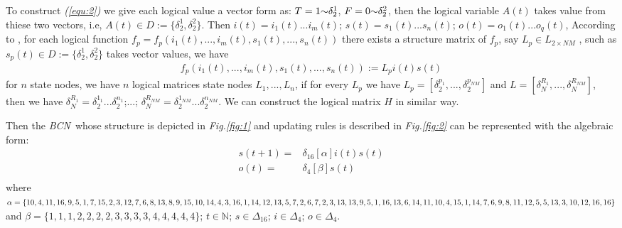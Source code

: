 \documentclass[conference]{IEEEtran} %
\def \BCN {{\em BCN}}
\begin{document}
To construct {\em (\ref{equ:2})} we give each logical value a vector form as: $T = 1 \scriptsize{\sim} \delta_2^1$, $F = 0 \scriptsize{\sim} \delta_2^2$, then the logical variable $A(t)$ takes value from thiese two vectors, i.e, $A(t)\in D:=\{\delta_2^1, \delta_2^2\}$. Then $i(t)=i_1(t)...i_m(t)$; $s(t)=s_1(t)...s_n(t)$; $o(t)=o_1(t)...o_q(t)$, According to \cite{Cheng2003Semi}, for each logical function $f_p=f_p(i_1(t),...,i_m(t),s_1(t),...,s_n(t))$ there exists a structure matrix of $f_p$, say $L_p\in L_{2\times {NM}}$ , such as $s_p(t)\in D:=\{\delta_2^1, \delta_2^2\}$  takes vector values, we have 
\begin{equation}
\begin{split}
f_p(i_1(t),...,i_m(t),s_1(t),...,s_n(t)):=L_pi(t)s(t)
\end{split}
\end{equation}
for $n$ state nodes, we have $n$ logical matrices state nodes $L_1,...,L_n$, if for every $L_p$ we have $L_p=[\delta_2^{p_1},...,\delta_2^{p_{NM}}]$ and $L=[\delta_N^{R_1},...,\delta_N^{R_{NM}}]$, then we have $\delta_N^{R_1}=\delta_2^{1_1}...\delta_2^{n_1}$;...; $\delta_N^{R_{NM}}=\delta_2^{1_{NM}}...\delta_2^{n_{NM}}$. We can construct the logical matrix $H$ in similar way.

Then the \BCN\ whose structure is depicted in {\em Fig.\ref{fig:1}} and updating rules is described in {\em Fig.\ref{fig:2}} can be represented with the algebraic form:
\begin{equation}
\begin{split}
s(t+1) =&\delta_{16}[\alpha]i(t)s(t)\\
o(t) =&\delta_4[\beta]s(t)\\
\end{split}
\end{equation}
where $\alpha=\{10,4,11,16,9,5,1, 7,15,2,3,12,7,6,8,13,8,9,\\15,10,14,4,3,16,1,14,12,13,5,7,2,6,7,2,3,13,13,9,5,1,\\16,13 ,6,14,11,10,4,15,1,14 ,7,6,9 ,8,11,12,5,5,13,3,10,\\12,16,16\}$ and $\beta=\{1,1,1,2,2,2,2,3,3,3,3,4,4,4,4,4\}$; $t\in \mathbb{N}$; $s\in \Delta_{16}$; $i\in \Delta_4$; $o\in \Delta_4$.
\end{document}
